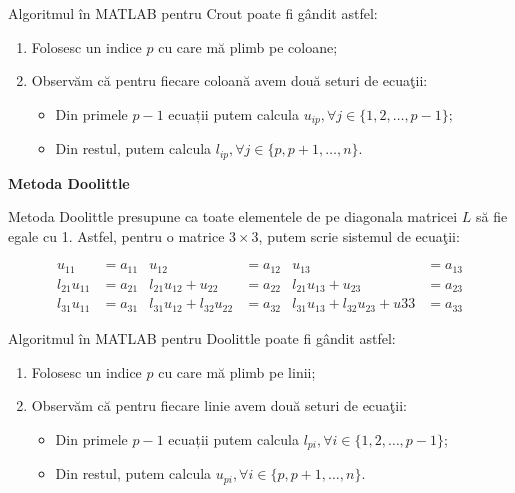 \documentclass{exam}
\newcommand{\octavescript}[2]{

}
\begin{document}
\par Algoritmul în MATLAB pentru Crout poate fi gândit astfel:

\begin{enumerate}
	\item Folosesc un indice $p$ cu care mă plimb pe coloane;
	\item Observăm că pentru fiecare coloană avem două seturi de ecuaţii:
	      \begin{itemize}
		      \item Din primele $p - 1$ ecuații putem calcula $u_{ip}, \forall j \in \{1, 2, \ldots, p - 1\}$;
		      \item Din restul, putem calcula $l_{ip}, \forall j \in \{p, p + 1, \ldots, n\}$.
	      \end{itemize}
\end{enumerate}

\newpage
\octavescript{./src/crout.m}{}

\textbf{Metoda Doolittle}

\par Metoda Doolittle presupune ca toate elementele de pe diagonala matricei $L$
să fie egale cu 1. Astfel, pentru o matrice $3 \times 3$, putem scrie sistemul
de ecuaţii:

\begin{align*}
	u_{11}       & = a_{11} & u_{12}                      & = a_{12} & u_{13}                              & = a_{13} \\
	l_{21}u_{11} & = a_{21} & l_{21}u_{12} + u_{22}       & = a_{22} & l_{21}u_{13} + u_{23}               & = a_{23} \\
	l_{31}u_{11} & = a_{31} & l_{31}u_{12} + l_{32}u_{22} & = a_{32} & l_{31}u_{13} + l_{32}u_{23} + u{33} & = a_{33}
\end{align*}

\par Algoritmul în MATLAB pentru Doolittle poate fi gândit astfel:

\begin{enumerate}
	\item Folosesc un indice $p$ cu care mă plimb pe linii;
	\item Observăm că pentru fiecare linie avem două seturi de ecuaţii:
	      \begin{itemize}
		      \item Din primele $p - 1$ ecuații putem calcula $l_{pi}, \forall i \in \{1, 2, \ldots, p - 1\}$;
		      \item Din restul, putem calcula $u_{pi}, \forall i \in \{p, p + 1, \ldots, n\}$.
	      \end{itemize}
\end{enumerate}
\end{document}
